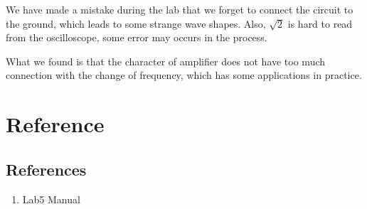 \documentclass{article}
\begin{document}
We have made a mistake during the lab that we forget to connect the circuit to the ground, which leads to some strange wave shapes. Also, $\sqrt{2}$ is hard to read from the oscilloscope, some error may occurs in the process.

What we found is that the character of amplifier does not have too much connection with the change of frequency, which has some applications in practice.

\section{Reference}

\subsection{References}
\begin{enumerate}
	\item Lab5 Manual
\end{enumerate}
\end{document}
